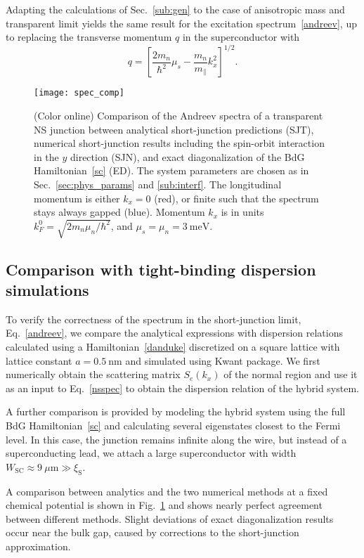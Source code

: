 \documentclass[twocolumn, notitlepage, 10pt, aps, floatfix, showpacs, prb, citeautoscript]{revtex4-1}
\begin{document}
Adapting the calculations of Sec.~\ref{sub:gen} to the case of anisotropic mass and transparent limit yields the same result for the excitation spectrum~\eqref{andreev}, up to replacing the transverse momentum $q$ in the superconductor with
\begin{equation}\label{aniso}
q = \left[\frac{2m_n}{\hbar^2}\mu_s
-\frac{m_n}{m_\parallel}k_x^2\right]^{1/2}.
\end{equation}

\begin{figure}[t]
\texttt{[image: spec\_comp]}
\caption{(Color online) Comparison of the Andreev spectra of a transparent NS junction between analytical short-junction predictions (SJT), numerical short-junction results including the spin-orbit interaction in the $y$ direction (SJN), and exact diagonalization of the BdG Hamiltonian~\eqref{sc} (ED).
The system parameters are chosen as in Sec.~\ref{sec:phys_params} and \ref{sub:interf}.
The longitudinal momentum is either $k_x=0$ (red), or finite such that the spectrum stays always gapped (blue).
Momentum $k_x$ is in units $k_F^0=\sqrt{2m_n\mu_n/\hbar^2}$, and $\mu_s=\mu_n=\SI{3}{\meV}$.}
\label{fig:spec_comp}
\end{figure}

\subsection{Comparison with tight-binding dispersion simulations}
To verify the correctness of the spectrum in the short-junction limit, Eq.~\eqref{andreev}, we compare the analytical expressions with dispersion relations calculated using a Hamiltonian~\eqref{danduke} discretized on a square lattice with lattice constant $a=\SI{0.5}{\nm}$ and simulated using Kwant package\cite{Groth2014}.
We first numerically obtain the scattering matrix $S_e(k_x)$ of the normal region and use it as an input to Eq.~\eqref{nsspec} to obtain the dispersion relation of the hybrid system.

A further comparison is provided by modeling the hybrid system using the full BdG Hamiltonian~\eqref{sc} and calculating several eigenstates closest to the Fermi level.
In this case, the junction remains infinite along the wire, but instead of a superconducting lead, we attach a large superconductor with width $W_\mathrm{SC} \approx \SI{9}{\mu\m} \gg \xi_\mathrm{S}$.

A comparison between analytics and the two numerical methods at a fixed chemical potential is shown in Fig.~\ref{fig:spec_comp} and shows nearly perfect agreement between different methods.
Slight deviations of exact diagonalization results occur near the bulk gap, caused by corrections to the short-junction approximation.
\end{document}
